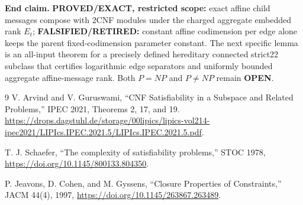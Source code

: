 \documentclass[11pt]{article}
\begin{document}
\textbf{End claim.}  \textbf{PROVED/EXACT, restricted scope:} exact affine
child messages compose with 2CNF modules under the charged aggregate embedded
rank $E_t$; \textbf{FALSIFIED/RETIRED:} constant affine codimension per edge
alone keeps the parent fixed-codimension parameter constant.  The next
specific lemma is an all-input theorem for a precisely defined hereditary
connected strict22 subclass that certifies logarithmic edge separators and
uniformly bounded aggregate affine-message rank.  Both $P=NP$ and $P\ne NP$
remain \textbf{OPEN}.

\begin{thebibliography}{9}
V. Arvind and V. Guruswami,
``CNF Satisfiability in a Subspace and Related Problems,'' IPEC 2021,
Theorems 2, 17, and 19.
\url{https://drops.dagstuhl.de/storage/00lipics/lipics-vol214-ipec2021/LIPIcs.IPEC.2021.5/LIPIcs.IPEC.2021.5.pdf}.

T. J. Schaefer, ``The complexity of satisfiability problems,'' STOC 1978,
\url{https://doi.org/10.1145/800133.804350}.

P. Jeavons, D. Cohen, and M. Gyssens, ``Closure Properties of Constraints,''
JACM 44(4), 1997, \url{https://doi.org/10.1145/263867.263489}.
\end{thebibliography}

\end{document}
